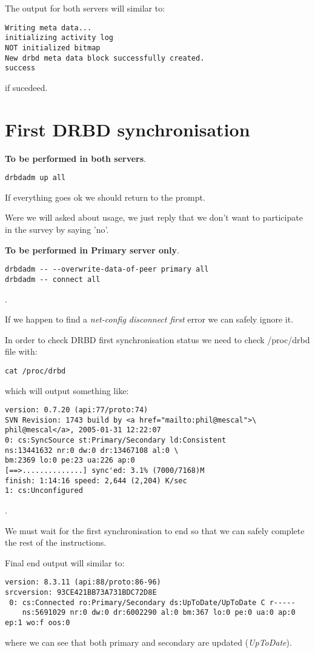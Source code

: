 The output for both servers will similar to:
\begin{verbatim}
Writing meta data...
initializing activity log
NOT initialized bitmap
New drbd meta data block successfully created.
success
\end{verbatim}
if sucedeed.

\section {First DRBD synchronisation}
\textbf{To be performed in both servers}.
\begin{verbatim}
drbdadm up all
\end{verbatim}
If everything goes ok we should return to the prompt.

Were we will asked about usage, we just reply that we don't want to participate in the survey by saying 'no'.

\textbf{To be performed in Primary server only}.
\begin{verbatim}
drbdadm -- --overwrite-data-of-peer primary all
drbdadm -- connect all
\end{verbatim}
.

If we happen to find a \textit{net-config disconnect first} error we can safely ignore it.

In order to check DRBD first synchronisation status we need to check /proc/drbd file with:
\begin{verbatim}
cat /proc/drbd
\end{verbatim}
which will output something like:
\begin{verbatim}
version: 0.7.20 (api:77/proto:74)
SVN Revision: 1743 build by <a href="mailto:phil@mescal">\
phil@mescal</a>, 2005-01-31 12:22:07
0: cs:SyncSource st:Primary/Secondary ld:Consistent
ns:13441632 nr:0 dw:0 dr:13467108 al:0 \
bm:2369 lo:0 pe:23 ua:226 ap:0
[==>..............] sync'ed: 3.1% (7000/7168)M
finish: 1:14:16 speed: 2,644 (2,204) K/sec
1: cs:Unconfigured
\end{verbatim}
.

We must wait for the first synchronisation to end so that we can safely complete the rest of the instructions.

Final end output will similar to:
\begin{verbatim}
version: 8.3.11 (api:88/proto:86-96)
srcversion: 93CE421BB73A731BDC72D8E 
 0: cs:Connected ro:Primary/Secondary ds:UpToDate/UpToDate C r-----
    ns:5691029 nr:0 dw:0 dr:6002290 al:0 bm:367 lo:0 pe:0 ua:0 ap:0 ep:1 wo:f oos:0
\end{verbatim}
where we can see that both primary and secondary are updated (\textit{UpToDate}).

